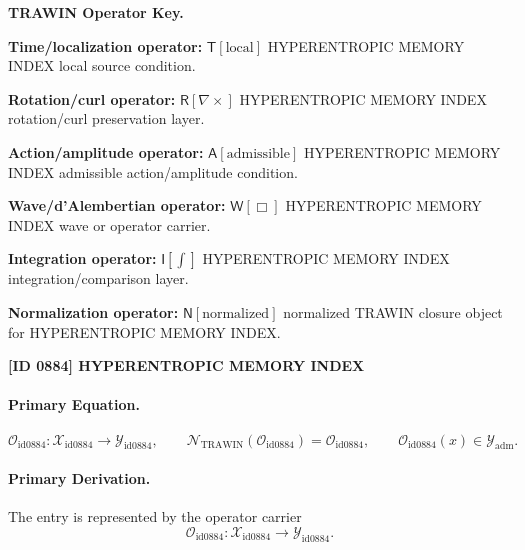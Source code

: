 \par\vspace{0.45\baselineskip}
\noindent\begin{minipage}[t]{\linewidth}
\begingroup
\small
\raggedright
\textbf{TRAWIN Operator Key.}\par
\noindent\textbf{Time/localization operator:} $\mathsf{T}\!\left[\mathrm{local}\right]$ HYPERENTROPIC MEMORY INDEX local source condition.\par
\noindent\textbf{Rotation/curl operator:} $\mathsf{R}\!\left[\nabla\times\right]$ HYPERENTROPIC MEMORY INDEX rotation/curl preservation layer.\par
\noindent\textbf{Action/amplitude operator:} $\mathsf{A}\!\left[\mathrm{admissible}\right]$ HYPERENTROPIC MEMORY INDEX admissible action/amplitude condition.\par
\noindent\textbf{Wave/d'Alembertian operator:} $\mathsf{W}\!\left[\Box\right]$ HYPERENTROPIC MEMORY INDEX wave or operator carrier.\par
\noindent\textbf{Integration operator:} $\mathsf{I}\!\left[\int\right]$ HYPERENTROPIC MEMORY INDEX integration/comparison layer.\par
\noindent\textbf{Normalization operator:} $\mathsf{N}\!\left[\mathrm{normalized}\right]$ normalized TRAWIN closure object for HYPERENTROPIC MEMORY INDEX.\par
\endgroup
\end{minipage}

\clearpage
\noindent\textbf{[ID 0884] HYPERENTROPIC MEMORY INDEX}\par
\vspace{0.35em}
\paragraph{Primary Equation.}
\[
\mathcal{O}_{\mathrm{id0884}}:\mathcal{X}_{\mathrm{id0884}}\longrightarrow \mathcal{Y}_{\mathrm{id0884}},\qquad
\mathcal{N}_{\mathrm{TRAWIN}}(\mathcal{O}_{\mathrm{id0884}})=\mathcal{O}_{\mathrm{id0884}},\qquad
\mathcal{O}_{\mathrm{id0884}}(x)\in\mathcal{Y}_{\mathrm{adm}}.
\]

\paragraph{Primary Derivation.} The entry is represented by the operator carrier\[
\mathcal{O}_{\mathrm{id0884}}:\mathcal{X}_{\mathrm{id0884}}\longrightarrow \mathcal{Y}_{\mathrm{id0884}}.
\]

